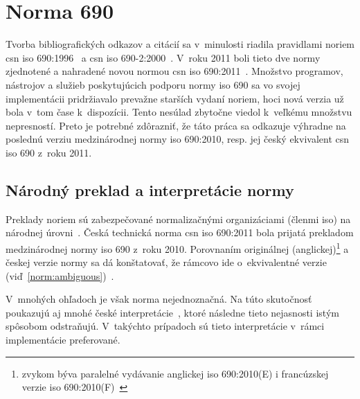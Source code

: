 \documentclass[
  color,
  table,
  nolof,
  oneside,
]{fithesis3}
\begin{document}



\chapter{Norma  690}\label{ch:norm}

Tvorba bibliografických odkazov a citácií sa v~minulosti riadila pravidlami noriem \gls{csn} \gls{iso} 690:1996~\cite{csn:iso690:1996} a \gls{csn} \gls{iso} 690-2:2000~\cite{csn:iso690:2:2000}. V~roku 2011 boli tieto dve normy zjednotené a nahradené novou normou \gls{csn} \gls{iso} 690:2011~\cite{csn:iso690:2011}. Množstvo programov, nástrojov a služieb poskytujúcich podporu normy \gls{iso} 690 sa vo svojej implementácii pridržiavalo prevažne starších vydaní noriem, hoci nová verzia už bola v~tom čase k~dispozícii. Tento nesúlad zbytočne viedol k~veľkému množstvu nepresností. Preto je potrebné zdôrazniť, že táto práca sa odkazuje výhradne na poslednú verziu medzinárodnej normy \gls{iso} 690:2010, resp. jej český ekvivalent \gls{csn} \gls{iso} 690 z~roku 2011.

\section{Národný preklad a interpretácie normy}

Preklady noriem sú zabezpečované normalizačnými organizáciami (členmi \gls{iso}) na národnej úrovni~\cite{isoMembershipManual}. Česká technická norma \gls{csn} \gls{iso} 690:2011 bola prijatá prekladom medzinárodnej normy \gls{iso} 690 z~roku 2010. Porovnaním originálnej (anglickej)\footnote{zvykom býva paralelné vydávanie anglickej \gls{iso} 690:2010(E) i francúzskej verzie \gls{iso} 690:2010(F)~\cite{Bratkova2010}} a českej verzie normy sa dá konštatovať, že rámcovo ide o~ekvivalentné verzie (viď~\ref{norm:ambiguous})~\cite{csn:iso690:2011,iso690:2010}.

V~mnohých ohľadoch je však norma nejednoznačná. Na túto skutočnosť poukazujú aj mnohé české interpretácie~\cite{Biernatova2011,Bratkova2011,Kratochvil2011}, ktoré následne tieto nejasnosti istým spôsobom odstraňujú. V~takýchto prípadoch sú tieto interpretácie v~rámci implementácie preferované.
\end{document}
